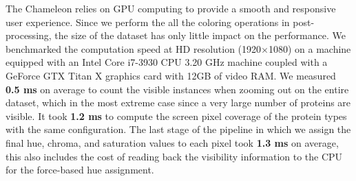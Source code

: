 \documentclass{egpubl}
\begin{document}
	The Chameleon relies on GPU computing to provide a smooth and responsive user experience.
	Since we perform the all the coloring operations in post-processing, the size of the dataset has only little impact on the performance. 
	We benchmarked the computation speed at HD resolution (1920$\times$1080) on a machine equipped with an Intel Core i7-3930 CPU 3.20 GHz machine coupled with a GeForce GTX Titan X graphics card with 12GB of video RAM.
	We measured \textbf{0.5 ms} on average to count the visible instances when zooming out on the entire dataset, which in the most extreme case since a very large number of proteins are visible.	
	It took \textbf{1.2 ms} to compute the screen pixel coverage of the protein types with the same configuration.
	The last stage of the pipeline in which we assign the final hue, chroma, and saturation values to each pixel took \textbf{1.3 ms} on average, this also includes the cost of reading back the visibility information to the CPU for the force-based hue assignment.
		
\end{document}
